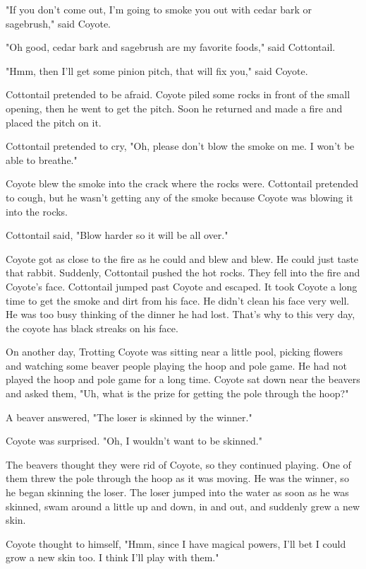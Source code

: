 "If you don't come out, I'm going to smoke you out with cedar bark or sagebrush," said Coyote.

"Oh good, cedar bark and sagebrush are my favorite foods," said Cottontail.

"Hmm, then I'll get some pinion pitch, that will fix you," said Coyote.

Cottontail pretended to be afraid. Coyote piled some rocks in front of the small opening, then he went to get the pitch. Soon he returned and made a fire and placed the pitch on it.

Cottontail pretended to cry, "Oh, please don't blow the smoke on me. I won't be able to breathe."

Coyote blew the smoke into the crack where the rocks were. Cottontail pretended to cough, but he wasn't getting any of the smoke because Coyote was blowing it into the rocks.

Cottontail said, "Blow harder so it will be all over."

Coyote got as close to the fire as he could and blew and blew. He could just taste that rabbit. Suddenly, Cottontail pushed the hot rocks. They fell into the fire and Coyote's face. Cottontail jumped past Coyote and escaped. It took Coyote a long time to get the smoke and dirt from his face. He didn't clean his face very well. He was too busy thinking of the dinner he had lost. That's why to this very day, the coyote has black streaks on his face.

On another day, Trotting Coyote was sitting near a little pool, picking flowers and watching some beaver people playing the hoop and pole game. He had not played the hoop and pole game for a long time. Coyote sat down near the beavers and asked them, "Uh, what is the prize for getting the pole through the hoop?"

A beaver answered, "The loser is skinned by the winner."

Coyote was surprised. "Oh, I wouldn't want to be skinned."

The beavers thought they were rid of Coyote, so they continued playing. One of them threw the pole through the hoop as it was moving. He was the winner, so he began skinning the loser. The loser jumped into the water as soon as he was skinned, swam around a little up and down, in and out, and suddenly grew a new skin.

Coyote thought to himself, "Hmm, since I have magical powers, I'll bet I could grow a new skin too. I think I'll play with them."

